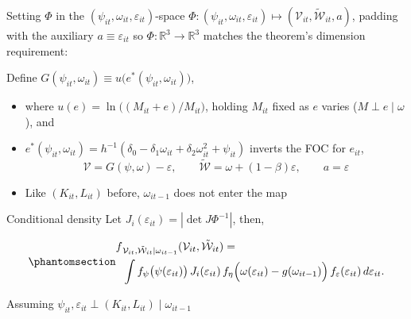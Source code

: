 \documentclass[
  ignorenonframetext,
  aspectratio=169,
]{beamer}
\begin{document}
\begin{frame}{Setting \(\Phi\) in the
\((\psi_{it},\omega_{it},\varepsilon_{it})\)-space}
\protect{}\label{setting-phi-in-the-psi_itomega_itvarepsilon_it-space}
\(\Phi:(\psi_{it},\omega_{it},\varepsilon_{it})\mapsto(\mathcal V_{it},\tilde{\mathcal W}_{it},a)\),
padding with the auxiliary \(a\equiv\varepsilon_{it}\) so
\(\Phi:\mathbb R^3\to\mathbb R^3\) matches the theorem's dimension
requirement:

Define
\(G(\psi_{it},\omega_{it})\equiv u\big(e^*(\psi_{it},\omega_{it})\big)\),

\begin{itemize}
\item
  where \(u(e)=\ln\!\big((M_{it}+e)/M_{it}\big)\), holding \(M_{it}\)
  fixed as \(e\) varies (\(M\perp e\mid\omega\)), and
\item
  \(e^*(\psi_{it},\omega_{it})=h^{-1}(\delta_0-\delta_1\omega_{it}+\delta_2\omega_{it}^2+\psi_{it})\)
  inverts the FOC for \(e_{it}\), \[
  \mathcal V=G(\psi,\omega)-\varepsilon,\qquad \tilde{\mathcal W}=\omega+(1-\beta)\varepsilon,\qquad a=\varepsilon
  \]
\item
  Like \((K_{it},L_{it})\) before, \(\omega_{it-1}\) does not enter the
  map
\end{itemize}
\end{frame}

\begin{frame}{Conditional density}
\protect{}\label{conditional-density}
Let \(J_i(\varepsilon_{it})=|\det J\Phi^{-1}|\), then,

\begin{equation}\protect\phantomsection\label{eq-Lunc-cond-lag}{
\begin{aligned}
    f&_{\mathcal V_{it},\tilde{\mathcal W}_{it}\mid \omega_{it-1}}(\mathcal V_{it},\tilde{\mathcal W}_{it})=\\
&\int f_\psi\big(\psi(\varepsilon_{it})\big)\,J_i(\varepsilon_{it})\,f_\eta\Big(\omega(\varepsilon_{it})-g(\omega_{it-1})\Big)\,f_\varepsilon(\varepsilon_{it})\,d\varepsilon_{it}.
\end{aligned}
}\end{equation}

Assuming
\(\psi_{it},\varepsilon_{it}\perp(K_{it},L_{it})\mid\omega_{it-1}\)
\end{frame}
\end{document}
